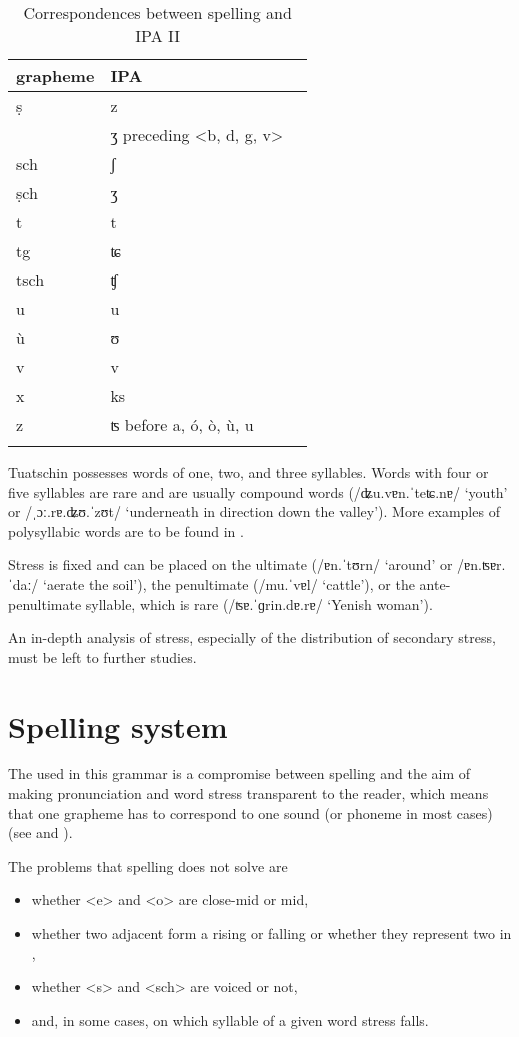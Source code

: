 \begin{table}
\caption{Correspondences between spelling and IPA II}
\label{graphIpaII}
\begin{tabular}{lll}
    \lsptoprule
        grapheme      & IPA\\
    \midrule
 ṣ & z\\
 & ʒ preceding <b, d, g, v>\\
  sch & ʃ\\
  ṣch & ʒ\\
  t & t\\
  tg& ʨ\\
  tsch & ʧ\\
  u & u\\
  ù & ʊ\\
  v & v\\
  x & ks\\
  z & ʦ before a, ó, ò, ù, u\\
  \lspbottomrule
\end{tabular}
\end{table}

 Tuatschin possesses words of one, two, and three syllables. Words with four or five syllables are rare and are usually compound words (/ʥu.vɐn.ˈteʨ.nɐ/ `youth' or /ˌɔː.rɐ.ʥʊ.ˈzʊt/ `underneath in direction down the valley'). More examples of polysyllabic words are to be found in .
 	
 	Stress is fixed and can be placed on the ultimate (/ɐn.ˈtʊrn/ `around' or /ɐn.ʦɐr. ˈdaː/ `aerate the soil'), the penultimate (/mu.ˈvɐl/ `cattle'), or the ante-penultimate syllable, which is rare (/ʦɐ.ˈɡrin.dɐ.rɐ/ `Yenish woman').

An in-depth analysis of stress, especially of the distribution of secondary stress, must be left to further studies.



\section{Spelling system}\label{sec:2.5}
The  used in this grammar is a compromise between  spelling and the aim of making pronunciation and word stress transparent to the reader, which means that one grapheme has to correspond to one sound (or phoneme in most cases) (see  and ). 

The problems that  spelling does not solve are

\begin{itemize}
\item whether <e> and <o> are close-mid or mid, 
\item whether two adjacent  form a rising or falling  or whether they represent two  in ,
\item whether <s> and <sch> are voiced or not, 
\item and, in some cases, on which syllable of a given word stress falls.
\end{itemize}
 
